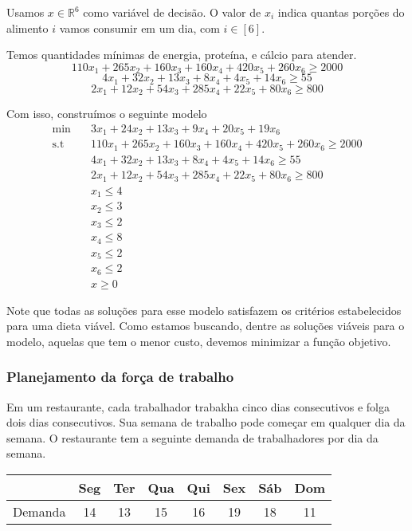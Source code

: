 \documentclass[]{article}
\numberwithin{equation}{section}
\begin{document}
Usamos $x \in \mathbb{R}^6$ como variável de decisão.
O valor de $x_i$ indica quantas porções do alimento $i$ vamos consumir em um dia, com $i \in [6]$.

Temos quantidades mínimas de energia, proteína, e cálcio para atender.
$$
110x_1 + 265x_2 + 160x_3 + 160x_4 + 420x_5 + 260x_6 \geq 2000
$$
$$
4x_1 + 32x_2 + 13x_3 + 8x_4 + 4x_5 + 14x_6 \geq 55
$$
$$
2x_1 + 12x_2 + 54x_3 + 285x_4 + 22x_5 + 80x_6 \geq 800
$$

Com isso, construímos o seguinte modelo
\begin{align}
\min        &\quad  3x_1 + 24x_2 + 13x_3 + 9x_4 + 20x_5 + 19x_6 \\
\text{s.t}  &\quad  110x_1 + 265x_2 + 160x_3 + 160x_4 + 420x_5 + 260x_6 \geq 2000 \\
            &\quad  4x_1 + 32x_2 + 13x_3 + 8x_4 + 4x_5 + 14x_6 \geq 55 \\
            &\quad  2x_1 + 12x_2 + 54x_3 + 285x_4 + 22x_5 + 80x_6 \geq 800 \\
            &\quad  x_1 \leq 4 \\
            &\quad  x_2 \leq 3 \\
            &\quad  x_3 \leq 2 \\
            &\quad  x_4 \leq 8 \\
            &\quad  x_5 \leq 2 \\
            &\quad  x_6 \leq 2 \\
            &\quad  x \geq 0
\end{align}

Note que todas as soluções para esse modelo satisfazem os critérios estabelecidos para uma dieta viável.
Como estamos buscando, dentre as soluções viáveis para o modelo, aquelas que tem o menor custo, devemos minimizar a função objetivo.

\subsubsection{Planejamento da força de trabalho}

Em um restaurante, cada trabalhador trabakha cinco dias consecutivos e folga dois dias consecutivos.
Sua semana de trabalho pode começar em qualquer dia da semana.
O restaurante tem a seguinte demanda de trabalhadores por dia da semana.

\begin{center}
\begin{tabular}{| c | c | c | c | c | c | c | c |}
\hline
& Seg & Ter & Qua & Qui & Sex & Sáb & Dom \\
\hline
Demanda & 14 & 13 & 15 & 16 & 19 & 18 & 11 \\
\hline
\end{tabular}
\end{center}
\end{document}
